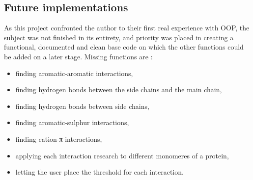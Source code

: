 \documentclass[]{article}
\begin{document}
\subsection{Future implementations}
As this project confronted the author to their first real experience with OOP, the subject was not finished in its entirety, and priority was placed in creating a functional, documented and clean base code on which the other functions could be added on a later stage.
Missing functions are : 
\begin{itemize}
	\item finding aromatic-aromatic interactions,
	\item finding hydrogen bonds between the side chains and the main chain,
	\item finding hydrogen bonds between side chains,
	\item finding aromatic-sulphur interactions,
	\item finding cation-π interactions,
	\item applying each interaction research to different monomeres of a protein,
	\item letting the user place the threshold for each interaction.
\end{itemize}
\end{document}
